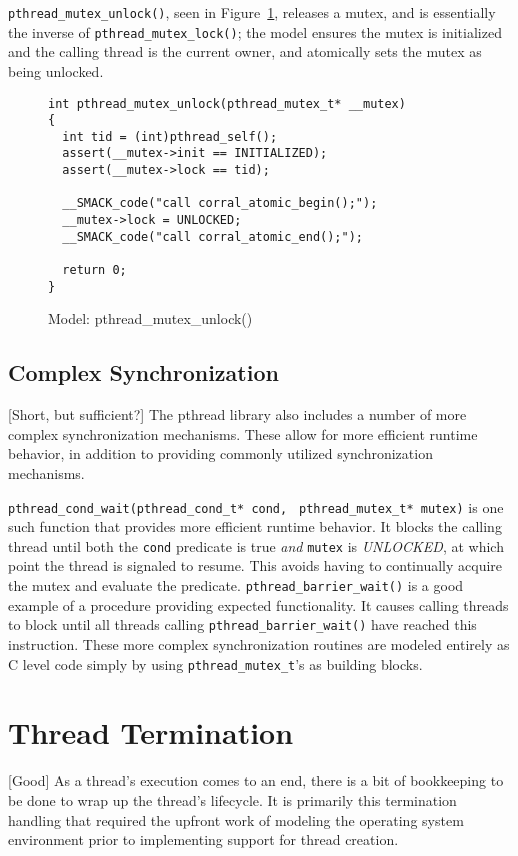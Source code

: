 \lstinline|pthread_mutex_unlock()|, seen in
Figure~\ref{fig:pthread_mutex_unlock}, releases a mutex, and is
essentially the inverse of \lstinline|pthread_mutex_lock()|; the model
ensures the mutex is initialized and the calling thread is the current
owner, and atomically sets the mutex as being unlocked. 

\begin{figure}[h]
\centering
\caption{Model: pthread\_mutex\_unlock()}
\label{fig:pthread_mutex_unlock}
\begin{lstlisting}
int pthread_mutex_unlock(pthread_mutex_t* __mutex)
{
  int tid = (int)pthread_self();
  assert(__mutex->init == INITIALIZED);
  assert(__mutex->lock == tid);

  __SMACK_code("call corral_atomic_begin();");
  __mutex->lock = UNLOCKED;
  __SMACK_code("call corral_atomic_end();");

  return 0;
}
\end{lstlisting}
\end{figure}

\subsection{Complex Synchronization}
[Short, but sufficient?]
The pthread library also includes a number of more complex
synchronization mechanisms.  These allow for more efficient runtime
behavior, in addition to providing commonly utilized synchronization
mechanisms.

\lstinline|pthread_cond_wait(pthread_cond_t* cond, |
\lstinline|pthread_mutex_t* mutex)|  is one such function that
provides more efficient runtime behavior.  It blocks the calling
thread until both the \lstinline|cond| predicate is true \emph{and}
\lstinline|mutex| is \emph{UNLOCKED}, at which point the thread is
signaled to resume. This avoids having to continually acquire the
mutex and evaluate the predicate.  \lstinline|pthread_barrier_wait()|
is a good example of a procedure providing expected functionality.  It
causes calling threads to block until all threads calling
\lstinline|pthread_barrier_wait()| have reached this instruction.
These more complex synchronization routines are modeled entirely as C
level code simply by using \lstinline|pthread_mutex_t|'s as building
blocks. 

\section{Thread Termination}
[Good]
As a thread's execution comes to an end, there is a bit of bookkeeping
to be done to wrap up the thread's lifecycle.  It is primarily this
termination handling that required the upfront work of modeling the
operating system environment prior to implementing support for thread
creation.

